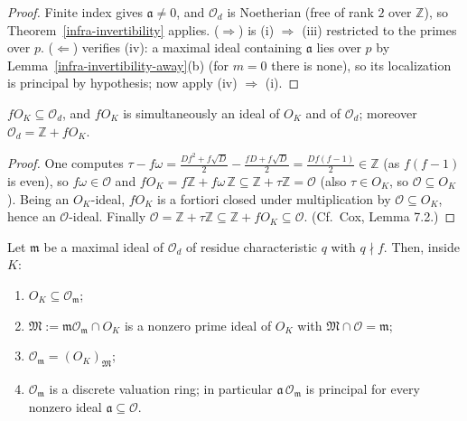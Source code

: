 \begin{proof}
  Finite index gives $\mathfrak{a} \neq 0$, and $\mathcal{O}_d$ is Noetherian
  (free of rank $2$ over $\mathbb{Z}$), so
  Theorem~\ref{infra-invertibility} applies.
  ($\Rightarrow$) is (i) $\Rightarrow$ (iii) restricted to the primes over $p$.
  ($\Leftarrow$) verifies (iv): a maximal ideal containing $\mathfrak{a}$ lies
  over $p$ by Lemma~\ref{infra-invertibility-away}(b) (for $m = 0$ there is
  none), so its localization is principal by hypothesis; now apply
  (iv) $\Rightarrow$ (i).
\end{proof}

\begin{lemma}\label{infra-invertibility-conductor}
  $f O_K \subseteq \mathcal{O}_d$, and $f O_K$ is simultaneously an ideal of
  $O_K$ and of $\mathcal{O}_d$; moreover $\mathcal{O}_d = \mathbb{Z} + f O_K$.
\end{lemma}

\begin{proof}
  One computes
  $\tau - f\omega = \tfrac{Df^2 + f\sqrt D}{2} - \tfrac{fD + f\sqrt D}{2}
    = \tfrac{Df(f-1)}{2} \in \mathbb{Z}$
  (as $f(f-1)$ is even), so $f\omega \in \mathcal{O}$ and
  $f O_K = f\mathbb{Z} + f\omega\,\mathbb{Z} \subseteq \mathbb{Z} + \tau\mathbb{Z} = \mathcal{O}$
  (also $\tau \in O_K$, so $\mathcal{O} \subseteq O_K$). Being an $O_K$-ideal,
  $f O_K$ is a fortiori closed under multiplication by
  $\mathcal{O} \subseteq O_K$, hence an $\mathcal{O}$-ideal. Finally
  $\mathcal{O} = \mathbb{Z} + \tau \mathbb{Z} \subseteq \mathbb{Z} + f O_K
    \subseteq \mathcal{O}$.
  (Cf.\ Cox, Lemma 7.2.)
\end{proof}

\begin{lemma}\label{infra-invertibility-dvr}
  Let $\mathfrak{m}$ be a maximal ideal of $\mathcal{O}_d$ of residue
  characteristic $q$ with $q \nmid f$. Then, inside $K$:
  \begin{enumerate}
    \item[(1)] $O_K \subseteq \mathcal{O}_{\mathfrak{m}}$;
    \item[(2)] $\mathfrak{M} := \mathfrak{m}\mathcal{O}_{\mathfrak{m}} \cap O_K$
      is a nonzero prime ideal of $O_K$ with
      $\mathfrak{M} \cap \mathcal{O} = \mathfrak{m}$;
    \item[(3)] $\mathcal{O}_{\mathfrak{m}} = (O_K)_{\mathfrak{M}}$;
    \item[(4)] $\mathcal{O}_{\mathfrak{m}}$ is a discrete valuation ring; in
      particular $\mathfrak{a}\,\mathcal{O}_{\mathfrak{m}}$ is principal for
      every nonzero ideal $\mathfrak{a} \subseteq \mathcal{O}$.
  \end{enumerate}
\end{lemma}

